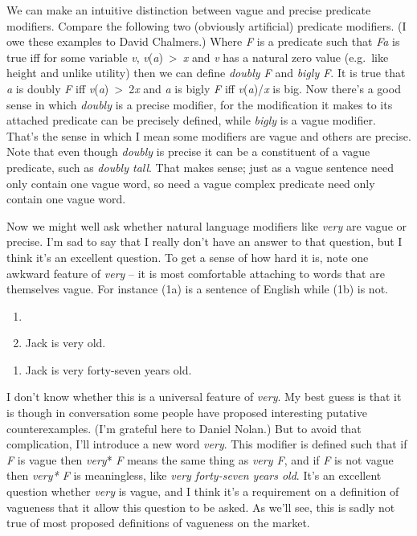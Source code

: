 \documentclass[
  11pt,
  letterpaper,
  DIV=11,
  numbers=noendperiod,
  twoside]{scrartcl}
\providecommand{\tightlist}{%
  \setlength{\itemsep}{0pt}\setlength{\parskip}{0pt}}\usepackage{longtable,booktabs,array}
\begin{document}
We can make an intuitive distinction between vague and precise predicate
modifiers. Compare the following two (obviously artificial) predicate
modifiers. (I owe these examples to David Chalmers.) Where \emph{F} is a
predicate such that \emph{Fa} is true iff for some variable \emph{v},
\emph{v}(\emph{a})~\textgreater~\emph{x} and \emph{v} has a natural zero
value (e.g.~like height and unlike utility) then we can define
\emph{doubly F} and \emph{bigly F}. It is true that \emph{a} is doubly
\emph{F} iff \emph{v}(\emph{a})~\textgreater~2\emph{x} and \emph{a} is
bigly \emph{F} iff \emph{v}(\emph{a})/\emph{x} is big. Now there's a
good sense in which \emph{doubly} is a precise modifier, for the
modification it makes to its attached predicate can be precisely
defined, while \emph{bigly} is a vague modifier. That's the sense in
which I mean some modifiers are vague and others are precise. Note that
even though \emph{doubly} is precise it can be a constituent of a vague
predicate, such as \emph{doubly tall}. That makes sense; just as a vague
sentence need only contain one vague word, so need a vague complex
predicate need only contain one vague word.

Now we might well ask whether natural language modifiers like
\emph{very} are vague or precise. I'm sad to say that I really don't
have an answer to that question, but I think it's an excellent question.
To get a sense of how hard it is, note one awkward feature of
\emph{very} -- it is most comfortable attaching to words that are
themselves vague. For instance (1a) is a sentence of English while (1b)
is not.

\begin{description}
\tightlist
\item[(1)]
\begin{enumerate}
\def\labelenumi{(\alph{enumi})}
\tightlist
\item[]
\item
  Jack is very old.
\end{enumerate}

\begin{enumerate}
\def\labelenumi{(\alph{enumi})}
\setcounter{enumi}{1}
\tightlist
\item
  Jack is very forty-seven years old.
\end{enumerate}
\end{description}

I don't know whether this is a universal feature of \emph{very}. My best
guess is that it is though in conversation some people have proposed
interesting putative counterexamples. (I'm grateful here to Daniel
Nolan.) But to avoid that complication, I'll introduce a new word
\emph{very}. This modifier is defined such that if \emph{F} is vague
then \emph{very}* \emph{F} means the same thing as \emph{very F}, and if
\emph{F} is not vague then \emph{very* F} is meaningless, like
\emph{very forty-seven years old}. It's an excellent question whether
\emph{very} is vague, and I think it's a requirement on a definition of
vagueness that it allow this question to be asked. As we'll see, this is
sadly not true of most proposed definitions of vagueness on the market.
\end{document}
